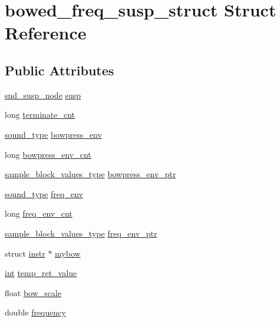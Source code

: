 \hypertarget{structbowed__freq__susp__struct}{}\section{bowed\+\_\+freq\+\_\+susp\+\_\+struct Struct Reference}
\label{structbowed__freq__susp__struct}
\subsection*{Public Attributes}
\begin{DoxyCompactItemize}
\item 
\hyperlink{sound_8h_a6b268203688a934bd798ceb55f85d4c0}{snd\+\_\+susp\+\_\+node} \hyperlink{structbowed__freq__susp__struct_ad584afca9b20bd051209b57122bcb279}{susp}
\item 
long \hyperlink{structbowed__freq__susp__struct_a26106dc8432360a941392e386fe79063}{terminate\+\_\+cnt}
\item 
\hyperlink{sound_8h_a792cec4ed9d6d636d342d9365ba265ea}{sound\+\_\+type} \hyperlink{structbowed__freq__susp__struct_aae1ea425fcf2e7b9960c2bf4c1b11ab3}{bowpress\+\_\+env}
\item 
long \hyperlink{structbowed__freq__susp__struct_a5264cf6fff2cde8040c1d7cdd67fbf40}{bowpress\+\_\+env\+\_\+cnt}
\item 
\hyperlink{sound_8h_a83d17f7b465d1591f27cd28fc5eb8a03}{sample\+\_\+block\+\_\+values\+\_\+type} \hyperlink{structbowed__freq__susp__struct_aef983ae9a5524d3f67f5cd2d7e86832f}{bowpress\+\_\+env\+\_\+ptr}
\item 
\hyperlink{sound_8h_a792cec4ed9d6d636d342d9365ba265ea}{sound\+\_\+type} \hyperlink{structbowed__freq__susp__struct_a0b4d95711bffede12d3a9b6789eed9ab}{freq\+\_\+env}
\item 
long \hyperlink{structbowed__freq__susp__struct_af1b956713236aac21a5ca30966f6118e}{freq\+\_\+env\+\_\+cnt}
\item 
\hyperlink{sound_8h_a83d17f7b465d1591f27cd28fc5eb8a03}{sample\+\_\+block\+\_\+values\+\_\+type} \hyperlink{structbowed__freq__susp__struct_af6895eca629763bac6daa9e3476e54ed}{freq\+\_\+env\+\_\+ptr}
\item 
struct \hyperlink{structinstr}{instr} $\ast$ \hyperlink{structbowed__freq__susp__struct_a1ba9fd3a2762e24284f366f59687f395}{mybow}
\item 
\hyperlink{xmltok_8h_a5a0d4a5641ce434f1d23533f2b2e6653}{int} \hyperlink{structbowed__freq__susp__struct_ab58885f55727eac7b89a1487b6834884}{temp\+\_\+ret\+\_\+value}
\item 
float \hyperlink{structbowed__freq__susp__struct_ac6d10256ce2d48ff7a8e590fcdf8fb5f}{bow\+\_\+scale}
\item 
double \hyperlink{structbowed__freq__susp__struct_ac86228521ad700d0e2eef342990d91da}{frequency}
\end{DoxyCompactItemize}


